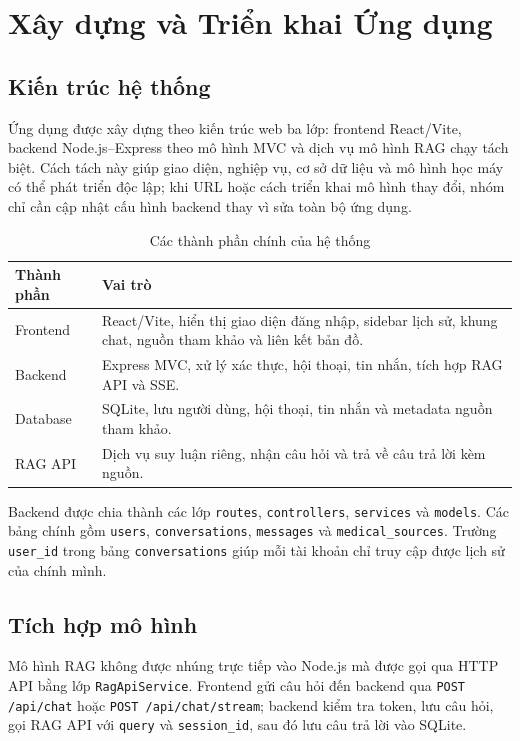 \chapter{Xây dựng và Triển khai Ứng dụng}
\label{chap:deployment}

\section{Kiến trúc hệ thống}
Ứng dụng được xây dựng theo kiến trúc web ba lớp: frontend React/Vite, backend Node.js--Express theo mô hình MVC và dịch vụ mô hình RAG chạy tách biệt. Cách tách này giúp giao diện, nghiệp vụ, cơ sở dữ liệu và mô hình học máy có thể phát triển độc lập; khi URL hoặc cách triển khai mô hình thay đổi, nhóm chỉ cần cập nhật cấu hình backend thay vì sửa toàn bộ ứng dụng.

\begin{table}[H]
\centering
\caption{Các thành phần chính của hệ thống}
\label{tab:deployment-components}
\begin{tabularx}{\textwidth}{p{3.4cm}Y}
\toprule
\textbf{Thành phần} & \textbf{Vai trò}\\
\midrule
Frontend & React/Vite, hiển thị giao diện đăng nhập, sidebar lịch sử, khung chat, nguồn tham khảo và liên kết bản đồ.\\
Backend & Express MVC, xử lý xác thực, hội thoại, tin nhắn, tích hợp RAG API và SSE.\\
Database & SQLite, lưu người dùng, hội thoại, tin nhắn và metadata nguồn tham khảo.\\
RAG API & Dịch vụ suy luận riêng, nhận câu hỏi và trả về câu trả lời kèm nguồn.\\
\bottomrule
\end{tabularx}
\end{table}

Backend được chia thành các lớp \texttt{routes}, \texttt{controllers}, \texttt{services} và \texttt{models}. Các bảng chính gồm \texttt{users}, \texttt{conversations}, \texttt{messages} và \texttt{medical\_sources}. Trường \texttt{user\_id} trong bảng \texttt{conversations} giúp mỗi tài khoản chỉ truy cập được lịch sử của chính mình.

\section{Tích hợp mô hình}
Mô hình RAG không được nhúng trực tiếp vào Node.js mà được gọi qua HTTP API bằng lớp \texttt{RagApiService}. Frontend gửi câu hỏi đến backend qua \texttt{POST /api/chat} hoặc \texttt{POST /api/chat/stream}; backend kiểm tra token, lưu câu hỏi, gọi RAG API với \texttt{query} và \texttt{session\_id}, sau đó lưu câu trả lời vào SQLite.

